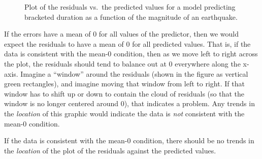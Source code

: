 \documentclass[
  letterpaper,
  DIV=11,
  numbers=noendperiod]{scrreprt}
\theoremstyle{plain}
\theoremstyle{definition}
\theoremstyle{definition}
\theoremstyle{remark}
\begin{document}
\begin{figure}


\caption{\label{fig-regassessment-mean0}Plot of the residuals vs.~the
predicted values for a model predicting bracketed duration as a function
of the magnitude of an earthquake.}

\end{figure}%

If the errors have a mean of 0 for all values of the predictor, then we
would expect the residuals to have a mean of 0 for all predicted values.
That is, if the data is consistent with the mean-0 condition, then as we
move left to right across the plot, the residuals should tend to balance
out at 0 everywhere along the x-axis. Imagine a ``window'' around the
residuals (shown in the figure as vertical green rectangles), and
imagine moving that window from left to right. If that window has to
shift up or down to contain the cloud of residuals (so that the window
is no longer centered around 0), that indicates a problem. Any trends in
the \emph{location} of this graphic would indicate the data is
\emph{not} consistent with the mean-0 condition.

\begin{tcolorbox}[enhanced jigsaw, breakable, titlerule=0mm, colframe=quarto-callout-note-color-frame, bottomtitle=1mm, opacityback=0, rightrule=.15mm, toptitle=1mm, arc=.35mm, bottomrule=.15mm, left=2mm, title=\textcolor{quarto-callout-note-color}{\faInfo}\hspace{0.5em}{Graphically Assessing the Mean-0 Condition}, leftrule=.75mm, coltitle=black, toprule=.15mm, colbacktitle=quarto-callout-note-color!10!white, colback=white, opacitybacktitle=0.6]

If the data is consistent with the mean-0 condition, there should be no
trends in the \emph{location} of the plot of the residuals against the
predicted values.

\end{tcolorbox}
\end{document}

